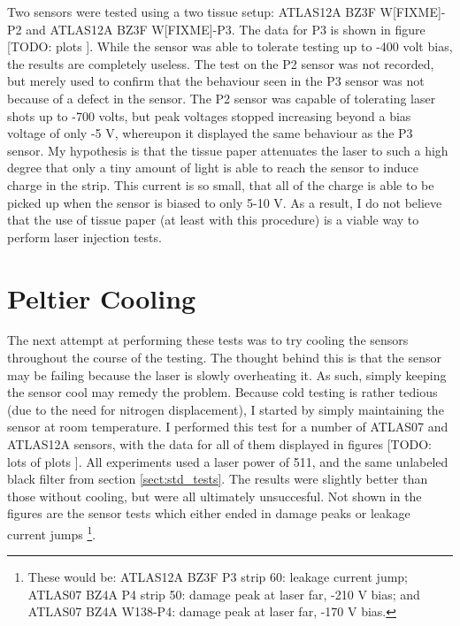 \documentclass{report}
\begin{document}
            Two sensors were tested using a two tissue setup: ATLAS12A BZ3F W[FIXME]-P2 and ATLAS12A BZ3F W[FIXME]-P3. The data for P3 is shown in figure [TODO: plots
            ]. While the sensor was able to tolerate testing up to -400 volt bias, the results are completely useless. The test on the P2 sensor was not recorded, but merely used to confirm that the behaviour seen in the P3 sensor was not because of a defect in the sensor. The P2 sensor was capable of tolerating laser shots up to -700 volts, but peak voltages stopped increasing beyond a bias voltage of only -5 V, whereupon it displayed the same behaviour as the P3 sensor. My hypothesis is that the tissue paper attenuates the laser to such a high degree that only a tiny amount of light is able to reach the sensor to induce charge in the strip. This current is so small, that all of the charge is able to be picked up when the sensor is biased to only 5-10 V. As a result, I do not believe that the use of tissue paper (at least with this procedure) is a viable way to perform laser injection tests.

            

        \section{Peltier Cooling}
            The next attempt at performing these tests was to try cooling the sensors throughout the course of the testing. The thought behind this is that the sensor may be failing because the laser is slowly overheating it. As such, simply keeping the sensor cool may remedy the problem. Because cold testing is rather tedious (due to the need for nitrogen displacement), I started by simply maintaining the sensor at room temperature. I performed this test for a number of ATLAS07 and ATLAS12A sensors, with the data for all of them displayed in figures [TODO: lots of plots
            ]. All experiments used a laser power of 511, and the same unlabeled black filter from section \ref{sect:std_tests}. The results were slightly better than those without cooling, but were all ultimately unsuccesful. Not shown in the figures are the sensor tests which either ended in damage peaks or leakage current jumps \footnote{These would be: ATLAS12A BZ3F P3 strip 60: leakage current jump; ATLAS07 BZ4A P4 strip 50: damage peak at laser far, -210 V bias; and ATLAS07 BZ4A W138-P4: damage peak at laser far, -170 V bias.}.
\end{document}
